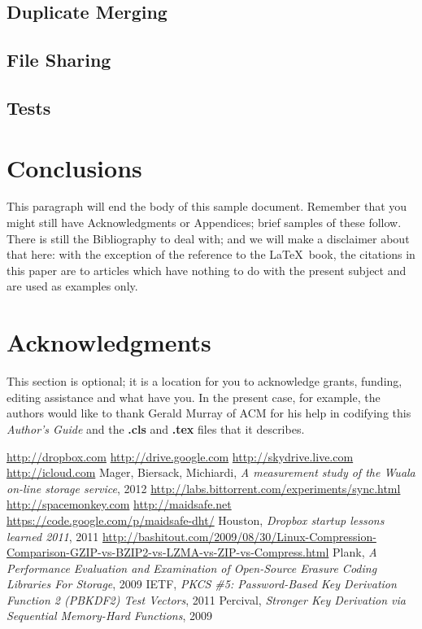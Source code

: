 \documentclass[11pt]{IEEEtran}
\begin{document}
\subsection{Duplicate Merging}

\subsection{File Sharing}

\subsection{Tests}

\section{Conclusions}
This paragraph will end the body of this sample document.
Remember that you might still have Acknowledgments or
Appendices; brief samples of these
follow.  There is still the Bibliography to deal with; and
we will make a disclaimer about that here: with the exception
of the reference to the \LaTeX\ book, the citations in
this paper are to articles which have nothing to
do with the present subject and are used as
examples only.

\section{Acknowledgments}
This section is optional; it is a location for you
to acknowledge grants, funding, editing assistance and
what have you.  In the present case, for example, the
authors would like to thank Gerald Murray of ACM for
his help in codifying this \textit{Author's Guide}
and the \textbf{.cls} and \textbf{.tex} files that it describes.


\begin{thebibliography}{1}
 \url{http://dropbox.com}
 \url{http://drive.google.com}
 \url{http://skydrive.live.com}
 \url{http://icloud.com}
 Mager, Biersack, Michiardi, \emph{A measurement study of the {W}uala on-line storage service}, 2012
 \url{http://labs.bittorrent.com/experiments/sync.html}
 \url{http://spacemonkey.com}
 \url{http://maidsafe.net}
 \url{https://code.google.com/p/maidsafe-dht/}
 Houston, \emph{Dropbox startup lessons learned 2011}, 2011
 \url{http://bashitout.com/2009/08/30/Linux-Compression-Comparison-GZIP-vs-BZIP2-vs-LZMA-vs-ZIP-vs-Compress.html}
 Plank, \emph{A Performance Evaluation and Examination of Open-Source Erasure Coding Libraries For Storage}, 2009
 IETF, \emph{PKCS \#5: Password-Based Key Derivation Function 2 (PBKDF2) Test Vectors}, 2011
 Percival, \emph{Stronger Key Derivation via Sequential Memory-Hard Functions}, 2009
\end{thebibliography}


\end{document}
